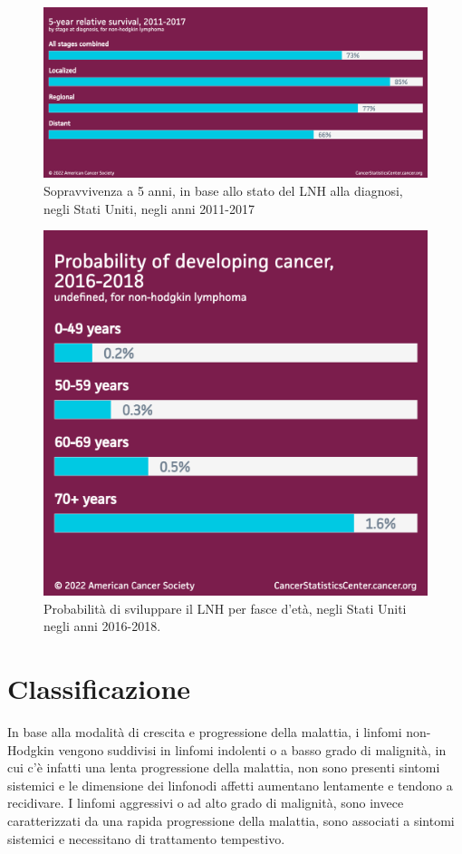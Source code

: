 \begin{figure}[h]
    \begin{center}
    \includegraphics[width=0.9\columnwidth]{img/5-year relative survival, 2011-2017 (by stage at diagnosis).png}
    \end{center}
    \caption[Sopravvivenza a 5 anni, in base allo stato del LNH alla diagnosi, negli Stati Uniti, negli anni 2011-2017]{Sopravvivenza a 5 anni, in base allo stato del LNH alla diagnosi, negli Stati Uniti, negli anni 2011-2017
    \cite{img13}}

\end{figure}

\begin{figure}[h]
    \begin{center}
    \includegraphics[width=0.6\columnwidth]{img/Probability of developing cancer, 2016-2018 (undefined).png}
    \end{center}
    \caption[Probabilità di sviluppare il LNH per fasce d’età, negli Stati Uniti negli anni 2016-2018.]{Probabilità di sviluppare il LNH per fasce d’età, negli Stati Uniti negli anni 2016-2018.
    \cite{img14}}

\end{figure}

\section{Classificazione}
In base alla modalità di crescita e progressione della malattia, i linfomi non-Hodgkin vengono suddivisi in 
linfomi indolenti o a basso grado di malignità, in cui c’è infatti una lenta progressione della malattia, 
non sono presenti sintomi sistemici e le dimensione dei linfonodi affetti aumentano lentamente e tendono a recidivare. 
I linfomi aggressivi o ad alto grado di malignità, sono invece caratterizzati da una rapida progressione della malattia, 
sono associati a sintomi sistemici e necessitano di trattamento tempestivo\cite{reteveneta}.\\

